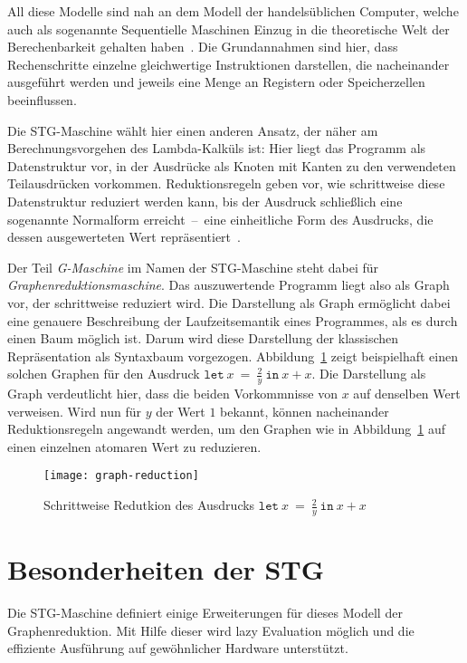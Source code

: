 All diese Modelle sind nah an dem Modell der handelsüblichen Computer, welche auch als sogenannte Sequentielle Maschinen Einzug in die theoretische Welt der Berechenbarkeit gehalten haben~\cite{Slot_ProblemSpaceInvariance}.
Die Grundannahmen sind hier, dass Rechenschritte einzelne gleichwertige Instruktionen darstellen, die nacheinander ausgeführt werden und jeweils eine Menge an Registern oder Speicherzellen beeinflussen.

Die STG-Maschine wählt hier einen anderen Ansatz, der näher am Berechnungsvorgehen des Lambda-Kalküls ist:
Hier liegt das Programm als Datenstruktur vor, in der Ausdrücke als Knoten mit Kanten zu den verwendeten Teilausdrücken vorkommen.
Reduktionsregeln geben vor, wie schrittweise diese Datenstruktur reduziert werden kann, bis der Ausdruck schließlich eine sogenannte Normalform erreicht~--~eine einheitliche Form des Ausdrucks, die dessen ausgewerteten Wert repräsentiert~\cite{Wadsworth_RelationComputationalDenotational}.

Der Teil \textit{G-Maschine} im Namen der STG-Maschine steht dabei für \textit{Graphenreduktionsmaschine}.
Das auszuwertende Programm liegt also als Graph vor, der schrittweise reduziert wird.
Die Darstellung als Graph ermöglicht dabei eine genauere Beschreibung der Laufzeitsemantik eines Programmes, als es durch einen Baum möglich ist.
Darum wird diese Darstellung der klassischen Repräsentation als Syntaxbaum vorgezogen.
Abbildung~\ref{fig:graph-reduction} zeigt beispielhaft einen solchen Graphen für den Ausdruck $\mathtt{let}\ x\ =\ \frac{2}{y}\ \mathtt{in}\ x + x$.
Die Darstellung als Graph verdeutlicht hier, dass die beiden Vorkommnisse von $x$ auf denselben Wert verweisen.
Wird nun für $y$ der Wert $1$ bekannt, können nacheinander Reduktionsregeln angewandt werden, um den Graphen wie in Abbildung~\ref{fig:graph-reduction} auf einen einzelnen atomaren Wert zu reduzieren.

\begin{figure}
  \centering
  \texttt{[image: graph-reduction]}
  \caption[Schrittweise Reduktion eines Ausdrucks]{Schrittweise Redutkion des Ausdrucks $\mathtt{let}\ x\ =\ \frac{2}{y}\ \mathtt{in}\ x + x$}\label{fig:graph-reduction}
\end{figure}


\section{Besonderheiten der STG}

Die STG-Maschine definiert einige Erweiterungen für dieses Modell der Graphenreduktion.
Mit Hilfe dieser wird lazy Evaluation möglich und die effiziente Ausführung auf gewöhnlicher Hardware unterstützt.

